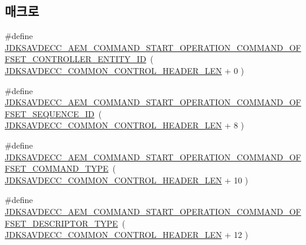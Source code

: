 \subsection*{매크로}
\begin{DoxyCompactItemize}
\item 
\#define \hyperlink{group__command__start__operation_gac5897e9435a0735843ccef9a07d4e449}{J\+D\+K\+S\+A\+V\+D\+E\+C\+C\+\_\+\+A\+E\+M\+\_\+\+C\+O\+M\+M\+A\+N\+D\+\_\+\+S\+T\+A\+R\+T\+\_\+\+O\+P\+E\+R\+A\+T\+I\+O\+N\+\_\+\+C\+O\+M\+M\+A\+N\+D\+\_\+\+O\+F\+F\+S\+E\+T\+\_\+\+C\+O\+N\+T\+R\+O\+L\+L\+E\+R\+\_\+\+E\+N\+T\+I\+T\+Y\+\_\+\+ID}~( \hyperlink{group__jdksavdecc__avtp__common__control__header_gaae84052886fb1bb42f3bc5f85b741dff}{J\+D\+K\+S\+A\+V\+D\+E\+C\+C\+\_\+\+C\+O\+M\+M\+O\+N\+\_\+\+C\+O\+N\+T\+R\+O\+L\+\_\+\+H\+E\+A\+D\+E\+R\+\_\+\+L\+EN} + 0 )
\item 
\#define \hyperlink{group__command__start__operation_ga26c54bfa351ec8a95f81263ba9cd1fdd}{J\+D\+K\+S\+A\+V\+D\+E\+C\+C\+\_\+\+A\+E\+M\+\_\+\+C\+O\+M\+M\+A\+N\+D\+\_\+\+S\+T\+A\+R\+T\+\_\+\+O\+P\+E\+R\+A\+T\+I\+O\+N\+\_\+\+C\+O\+M\+M\+A\+N\+D\+\_\+\+O\+F\+F\+S\+E\+T\+\_\+\+S\+E\+Q\+U\+E\+N\+C\+E\+\_\+\+ID}~( \hyperlink{group__jdksavdecc__avtp__common__control__header_gaae84052886fb1bb42f3bc5f85b741dff}{J\+D\+K\+S\+A\+V\+D\+E\+C\+C\+\_\+\+C\+O\+M\+M\+O\+N\+\_\+\+C\+O\+N\+T\+R\+O\+L\+\_\+\+H\+E\+A\+D\+E\+R\+\_\+\+L\+EN} + 8 )
\item 
\#define \hyperlink{group__command__start__operation_ga209fd91e48ab6244c32f70c21ab99d23}{J\+D\+K\+S\+A\+V\+D\+E\+C\+C\+\_\+\+A\+E\+M\+\_\+\+C\+O\+M\+M\+A\+N\+D\+\_\+\+S\+T\+A\+R\+T\+\_\+\+O\+P\+E\+R\+A\+T\+I\+O\+N\+\_\+\+C\+O\+M\+M\+A\+N\+D\+\_\+\+O\+F\+F\+S\+E\+T\+\_\+\+C\+O\+M\+M\+A\+N\+D\+\_\+\+T\+Y\+PE}~( \hyperlink{group__jdksavdecc__avtp__common__control__header_gaae84052886fb1bb42f3bc5f85b741dff}{J\+D\+K\+S\+A\+V\+D\+E\+C\+C\+\_\+\+C\+O\+M\+M\+O\+N\+\_\+\+C\+O\+N\+T\+R\+O\+L\+\_\+\+H\+E\+A\+D\+E\+R\+\_\+\+L\+EN} + 10 )
\item 
\#define \hyperlink{group__command__start__operation_ga80e1dec5ecd05e09cfebee1c16c5ec22}{J\+D\+K\+S\+A\+V\+D\+E\+C\+C\+\_\+\+A\+E\+M\+\_\+\+C\+O\+M\+M\+A\+N\+D\+\_\+\+S\+T\+A\+R\+T\+\_\+\+O\+P\+E\+R\+A\+T\+I\+O\+N\+\_\+\+C\+O\+M\+M\+A\+N\+D\+\_\+\+O\+F\+F\+S\+E\+T\+\_\+\+D\+E\+S\+C\+R\+I\+P\+T\+O\+R\+\_\+\+T\+Y\+PE}~( \hyperlink{group__jdksavdecc__avtp__common__control__header_gaae84052886fb1bb42f3bc5f85b741dff}{J\+D\+K\+S\+A\+V\+D\+E\+C\+C\+\_\+\+C\+O\+M\+M\+O\+N\+\_\+\+C\+O\+N\+T\+R\+O\+L\+\_\+\+H\+E\+A\+D\+E\+R\+\_\+\+L\+EN} + 12 )
\item 

\end{DoxyCompactItemize}
